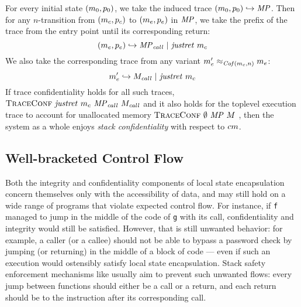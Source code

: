 \documentclass[acmsmall,review,anonymous]{acmart}\settopmatter{printfolios=true,printccs=false,printacmref=false}
\begin{document}
{%
For every initial state \((m_0,p_0)\), we take the induced trace
\((m_0,p_0) \hookrightarrow \mathit{MP}\). Then for
any \(n\)-transition from $(m_c,p_c)$ to
$(m_e,p_e)$ in $\mathit{MP}$, we take the prefix of the trace
from the entry point until its corresponding return:
%
\[(m_e,p_e) \hookrightarrow \mathit{MP}_{\mathit{call}} ~ | ~ \mathit{justret}\ m_c\]
%
We also take the corresponding trace from any variant \(m_e'
\approx_{\mathit{Cof}(m_c,n)} m_e\):
%
\[m_e' \hookrightarrow M_{\mathit{call}} ~ | ~ \mathit{justret}\ m_c\]
%
%
If trace confidentiality holds for all such traces,
\(\text{\sc TraceConf} ~ \mathit{justret}\ m_c ~ \mathit{MP}_{\mathit{call}} ~
M_{\mathit{call}}\) and it also holds for the toplevel execution
trace to account for unallocated memory \(\text{\sc TraceConf} ~
\emptyset ~ \mathit{MP} ~ M\) , then the system as a whole enjoys {\em
  stack confidentiality} with respect to \(cm\).

\subsection{Well-bracketed Control Flow}
\label{sec:wbcf}

Both the integrity and confidentiality components of local state
encapsulation concern themselves only with the accessibility of data,
and may still hold on a wide range of programs that violate expected
control flow. For instance, if {\tt f} managed to jump in the middle of
the code of {\tt g} with its call, confidentiality and integrity would
still be satisfied.
%
However, that is still unwanted behavior: for example, a caller (or a
callee) should not be able to bypass a password check by jumping (or
returning) in the middle of a block of code --- even if such an execution
would ostensibly satisfy local state encapsulation.
%
Stack safety enforcement mechanisms like \citet{Skorstengaard+19}
usually aim to prevent such unwanted flows: every jump between
functions should either be a call or a return, and each return should
be to the instruction after its corresponding call.

}
\end{document}
